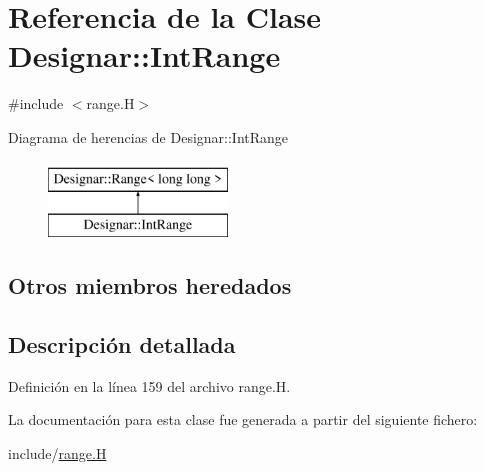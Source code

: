 \hypertarget{class_designar_1_1_int_range}{}\section{Referencia de la Clase Designar\+:\+:Int\+Range}
\label{class_designar_1_1_int_range}


{\ttfamily \#include $<$range.\+H$>$}

Diagrama de herencias de Designar\+:\+:Int\+Range\begin{figure}[H]
\begin{center}
\leavevmode
\includegraphics[height=2.000000cm]{class_designar_1_1_int_range}
\end{center}
\end{figure}
\subsection*{Otros miembros heredados}


\subsection{Descripción detallada}


Definición en la línea 159 del archivo range.\+H.



La documentación para esta clase fue generada a partir del siguiente fichero\+:\begin{DoxyCompactItemize}
\item 
include/\hyperlink{range_8_h}{range.\+H}\end{DoxyCompactItemize}
